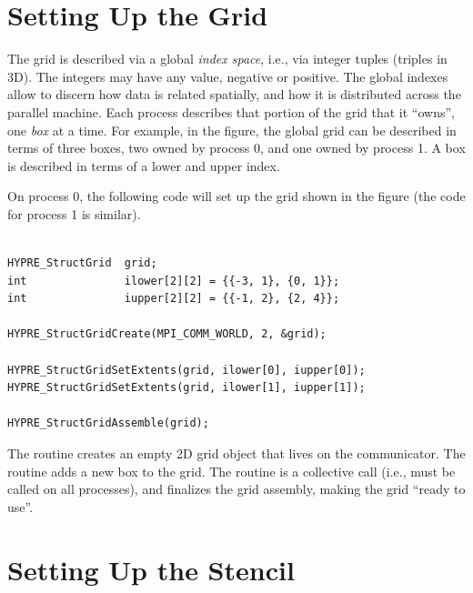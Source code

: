 
\section{Setting Up the Grid}
\label{Setting Up the Grid}

The grid is described via a global {\em index space}, i.e., via
integer tuples (triples in 3D).  The integers may have any value,
negative or positive.  The global indexes allow \hypre{} to discern
how data is related spatially, and how it is distributed across the
parallel machine.  Each process describes that portion of the grid
that it ``owns'', one {\em box} at a time.  For example, in the
figure, the global grid can be described in terms of three boxes, two
owned by process 0, and one owned by process 1.  A box is described in
terms of a lower and upper index.

On process 0, the following code will set up the grid shown in the
figure (the code for process 1 is similar).
\begin{display}
\begin{verbatim}

HYPRE_StructGrid  grid;
int               ilower[2][2] = {{-3, 1}, {0, 1}};
int               iupper[2][2] = {{-1, 2}, {2, 4}};

HYPRE_StructGridCreate(MPI_COMM_WORLD, 2, &grid);

HYPRE_StructGridSetExtents(grid, ilower[0], iupper[0]);
HYPRE_StructGridSetExtents(grid, ilower[1], iupper[1]);

HYPRE_StructGridAssemble(grid);

\end{verbatim}
\end{display}
The  routine creates an empty 2D grid object that lives
on the  communicator.  The 
routine adds a new box to the grid.  The  routine is
a collective call (i.e., must be called on all processes), and
finalizes the grid assembly, making the grid ``ready to use''.


\section{Setting Up the Stencil}
\label{Setting Up the Stencil}

